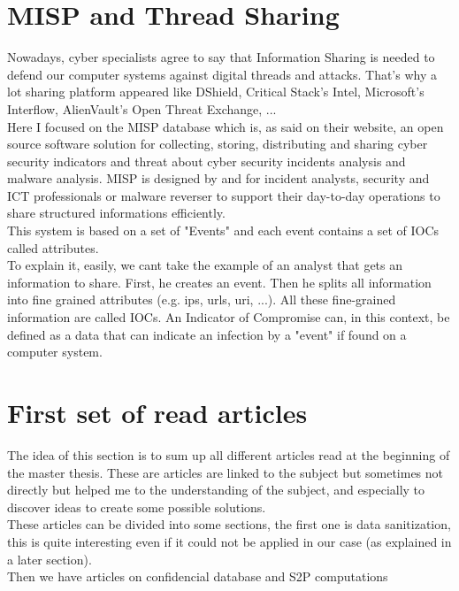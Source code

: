 \documentclass[10pt]{article}
\begin{document}
\section{MISP and Thread Sharing}
Nowadays, cyber specialists agree to say that Information Sharing is needed to defend our computer systems against digital threads and attacks. That's why a lot sharing platform appeared like DShield, Critical Stack’s Intel, Microsoft’s Interflow, AlienVault’s Open Threat Exchange, ...\\
Here I focused on the MISP database which is, as said on their website, an open source software solution for collecting, storing, distributing and sharing cyber security indicators and threat about cyber security incidents analysis and malware analysis. MISP is designed by and for incident analysts, security and ICT professionals or malware reverser to support their day-to-day operations to share structured informations efficiently.\\
This system is based on a set of "Events" and each event contains a set of IOCs called attributes. \\
To explain it, easily, we cant take the example of an analyst that gets an information to share. First, he creates an event. Then he splits all information into fine grained attributes (e.g. ips, urls, uri, ...). All these fine-grained information are called IOCs. An Indicator of Compromise can, in this context, be defined as a data that can indicate an infection by a "event" if found on a computer system.

\section{First set of read articles}
The idea of this section is to sum up all different articles read at the beginning of the master thesis. These are articles are linked to the subject but sometimes not directly but helped me to the understanding of the subject, and especially to discover ideas to create some possible solutions.\\
These articles can be divided into some sections, the first one is data sanitization, this is quite interesting even if it could not be applied in our case (as explained in a later section).\\
Then we have articles on confidencial database and S2P computations 
\end{document}
